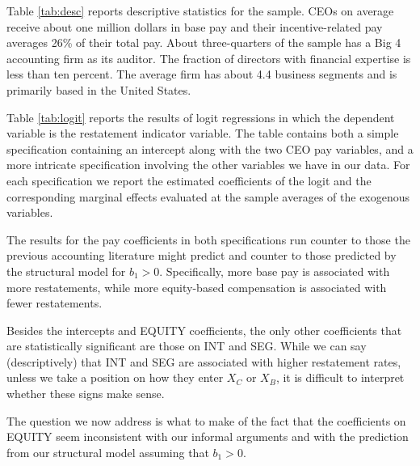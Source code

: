 Table \ref{tab:desc} reports descriptive statistics for the sample. 
CEOs on average receive about one million dollars in base pay and their incentive-related pay averages 26\% of their total pay.
About three-quarters of the sample has a Big 4 accounting firm as its auditor. 
The fraction of directors with financial expertise is less than ten percent. 
The average firm has about 4.4 business segments and is primarily based in the United States.

Table \ref{tab:logit} reports the results of logit regressions in which the dependent variable is the restatement indicator variable. 
The table contains both a simple specification containing an intercept along with the two CEO pay variables, and a more intricate specification involving the other variables we have in our data.
For each specification we report the estimated coefficients of the logit and the corresponding marginal effects evaluated at the sample averages of the exogenous variables.

The results for the pay coefficients in both specifications run counter to those the previous accounting literature might predict and counter to those predicted by the structural model for $b_1 > 0$.
Specifically, more base pay is associated with more restatements, while more equity-based compensation is associated with fewer restatements.

Besides the intercepts and EQUITY coefficients, the only other coefficients that are statistically significant are those on INT and SEG.
While we can say (descriptively) that INT and SEG are associated with higher restatement rates, unless we take a position on how they enter $X_C$ or $X_B$, it is difficult to interpret whether these signs make sense.

The question we now address is what to make of the fact that the coefficients on EQUITY seem inconsistent with our informal arguments and with the prediction from our structural model assuming that $b_1>0$.


